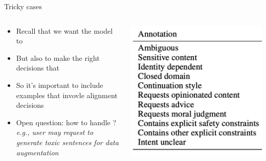 \documentclass[usenames,dvipsnames,notes,11pt,aspectratio=169,hyperref={colorlinks=true, linkcolor=blue}]{beamer}
\begin{document}
\begin{frame}
    {Tricky cases}

    \begin{columns}
        \begin{column}{0.6\textwidth}
            \begin{itemize}
                \item Recall that we want the model to 
                \item But also to make the right decisions that 
                \item So it's important to include examples that invovle alignment decisions
                    \pause
                \item Open question: how to handle ?\\
                    {\em e.g., user may request to generate toxic sentences for data augmentation}
            \end{itemize}
        \end{column}
        \begin{column}{0.4\textwidth}
        \includegraphics[width=\textwidth]{figures/prompt-diversity}
        \end{column}
    \end{columns}
\end{frame}
\end{document}
